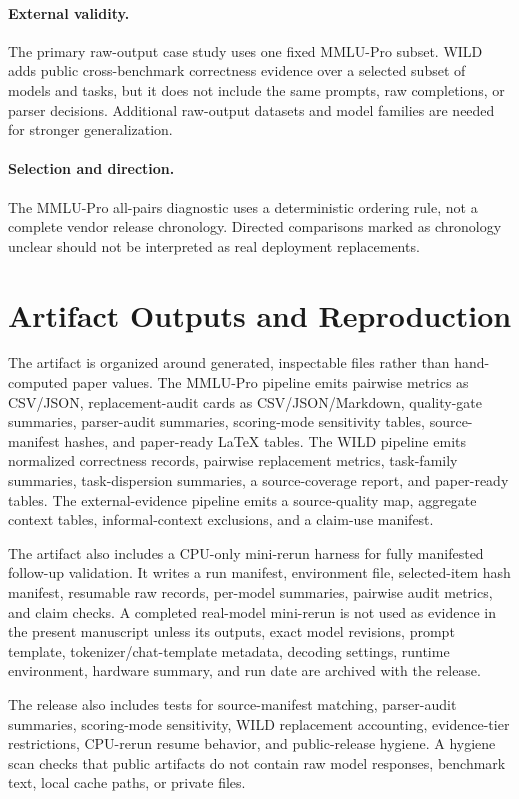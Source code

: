 \documentclass[manuscript, screen, review, nonacm]{jair}
\begin{document}
\paragraph{External validity.}
The primary raw-output case study uses one fixed MMLU-Pro subset. WILD adds public cross-benchmark correctness evidence over a selected subset of models and tasks, but it does not include the same prompts, raw completions, or parser decisions. Additional raw-output datasets and model families are needed for stronger generalization.

\paragraph{Selection and direction.}
The MMLU-Pro all-pairs diagnostic uses a deterministic ordering rule, not a complete vendor release chronology. Directed comparisons marked as chronology unclear should not be interpreted as real deployment replacements.

\section{Artifact Outputs and Reproduction}

The artifact is organized around generated, inspectable files rather than hand-computed paper values. The MMLU-Pro pipeline emits pairwise metrics as CSV/JSON, replacement-audit cards as CSV/JSON/Markdown, quality-gate summaries, parser-audit summaries, scoring-mode sensitivity tables, source-manifest hashes, and paper-ready LaTeX tables. The WILD pipeline emits normalized correctness records, pairwise replacement metrics, task-family summaries, task-dispersion summaries, a source-coverage report, and paper-ready tables. The external-evidence pipeline emits a source-quality map, aggregate context tables, informal-context exclusions, and a claim-use manifest.

The artifact also includes a CPU-only mini-rerun harness for fully manifested follow-up validation. It writes a run manifest, environment file, selected-item hash manifest, resumable raw records, per-model summaries, pairwise audit metrics, and claim checks. A completed real-model mini-rerun is not used as evidence in the present manuscript unless its outputs, exact model revisions, prompt template, tokenizer/chat-template metadata, decoding settings, runtime environment, hardware summary, and run date are archived with the release.

The release also includes tests for source-manifest matching, parser-audit summaries, scoring-mode sensitivity, WILD replacement accounting, evidence-tier restrictions, CPU-rerun resume behavior, and public-release hygiene. A hygiene scan checks that public artifacts do not contain raw model responses, benchmark text, local cache paths, or private files.
\end{document}
